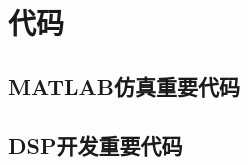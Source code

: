 \documentclass{article}
\newcounter{sub}
\begin{document}





\renewcommand{\thesection}{\Alph{section}~}

\appendix

\section{代码}%
\label{sec:代码}

\subsection{MATLAB仿真重要代码}%
\label{sub:Matlab仿真重要代码}


\subsection{DSP开发重要代码}%
\label{sub:DSP开发重要代码}



\printindex
\end{document}
